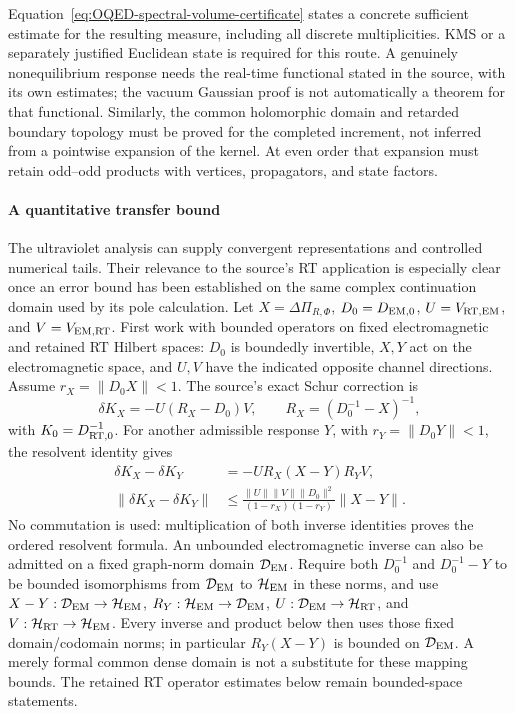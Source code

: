 \documentclass[final,5p,times,twocolumn,numbers,nopreprintline]{elsarticle}
\numberwithin{equation}{section}
\theoremstyle{definition}
\theoremstyle{remark}
\begin{document}
Equation~\eqref{eq:OQED-spectral-volume-certificate} states a concrete
sufficient estimate for the resulting measure, including all discrete
multiplicities. KMS or a separately justified Euclidean state is required
for this route. A genuinely nonequilibrium response needs the real-time
functional stated in the source, with its own estimates; the vacuum
Gaussian proof is not automatically a theorem for that functional.
Similarly, the common holomorphic domain and retarded boundary topology
must be proved for the completed increment, not inferred from a
pointwise expansion of the kernel. At even order that expansion must
retain odd--odd products with vertices, propagators, and state factors.

\paragraph{A quantitative transfer bound}
The ultraviolet analysis can supply convergent representations and
controlled numerical tails. Their relevance to the source's RT
application is especially clear once an error bound has been established
on the same complex continuation domain used by its pole calculation.
Let \(X=\Delta\Pi_{R,\Phi}\), \(D_0=D_{\rm EM,0}\),
\(U=V_{\rm RT,EM}\), and \(V=V_{\rm EM,RT}\). First work with
bounded operators on fixed electromagnetic and retained RT Hilbert
spaces: \(D_0\) is boundedly invertible, \(X,Y\) act on the
electromagnetic space, and \(U,V\) have the indicated opposite channel
directions. Assume \(r_X=\|D_0X\|<1\). The source's exact Schur
correction is
\begin{equation}
 \delta K_X=-U(R_X-D_0)V,\qquad
 R_X=(D_0^{-1}-X)^{-1},
\label{eq:OQED-Schur-increment}
\end{equation}
with \(K_0=D_{\rm RT,0}^{-1}\). For another admissible response
\(Y\), with \(r_Y=\|D_0Y\|<1\), the resolvent identity gives
\begin{equation}
\begin{aligned}
 \delta K_X-\delta K_Y&=-U R_X(X-Y)R_Y V,\\
 \|\delta K_X-\delta K_Y\|
 &\leq\frac{\|U\|\|V\|\|D_0\|^2}
                {(1-r_X)(1-r_Y)}\|X-Y\|.
\end{aligned}
\label{eq:OQED-Schur-error-bound}
\end{equation}
No commutation is used: multiplication of both inverse identities
proves the ordered resolvent formula. An unbounded electromagnetic
inverse can also be admitted on a fixed graph-norm domain
\(\mathcal D_{\rm EM}\). Require both \(D_0^{-1}\) and
\(D_0^{-1}-Y\) to be bounded isomorphisms from
\(\mathcal D_{\rm EM}\) to \(\mathcal H_{\rm EM}\) in these norms, and use
\(X-Y:\mathcal D_{\rm EM}\to\mathcal H_{\rm EM}\),
\(R_Y:\mathcal H_{\rm EM}\to\mathcal D_{\rm EM}\),
\(U:\mathcal D_{\rm EM}\to\mathcal H_{\rm RT}\), and
\(V:\mathcal H_{\rm RT}\to\mathcal H_{\rm EM}\).
Every inverse and product below then uses those fixed domain/codomain
norms; in particular \(R_Y(X-Y)\) is bounded on
\(\mathcal D_{\rm EM}\). A merely formal common dense domain is not
a substitute for these mapping bounds. The retained RT operator
estimates below remain bounded-space statements.
\end{document}
